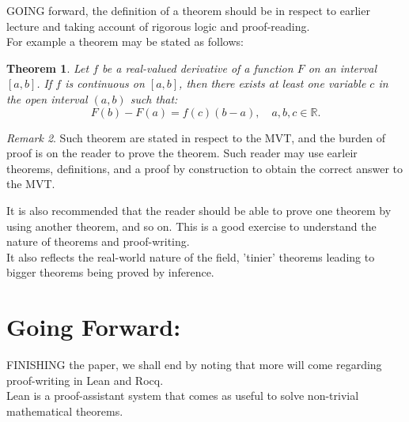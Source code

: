 \documentclass[10pt]{article}
\theoremstyle{plain}
\newtheorem{theorem}{Theorem}[section]
\theoremstyle{definition}
\theoremstyle{remark}
\newtheorem{remark}[theorem]{Remark}
\begin{document}
\lettrine[lines=2, lhang=0.1, loversize=0.2]{G}OING forward, the definition of a theorem should be in respect to earlier lecture and taking account of rigorous logic and proof-reading.\\
For example a theorem may be stated as follows:

\begin{theorem}
	Let $f$ be a real-valued derivative of a function $F$ on an interval $[a, b]$. If $f$ is continuous on $[a, b]$, then there exists at least one variable $c$ in the open interval $(a, b)$ such that:
	\begin{equation}
		F(b) - F(a) = f(c)(b - a), \quad a, b, c \in \mathbb{R}.
	\end{equation}
\end{theorem}
\begin{remark}
	Such theorem are stated in respect to the MVT, and the burden of proof is on the reader to prove the theorem. Such reader may use earleir theorems, definitions, and a proof by construction to obtain the correct answer to the MVT.
\end{remark}
It is also recommended that the reader should be able to prove one theorem by using another theorem, and so on. This is a good exercise to understand the nature of theorems and proof-writing.\\
It also reflects the real-world nature of the field, 'tinier' theorems leading to bigger theorems being proved by inference. 

\section{Going Forward:}

\lettrine[lines=2, lhang=0.1, loversize=0.2]{F}INISHING the paper, we shall end by noting that more will come regarding proof-writing in Lean and Rocq.\\Lean is a proof-assistant system that comes as useful to solve non-trivial mathematical theorems.

\nocite{*}





\end{document}
